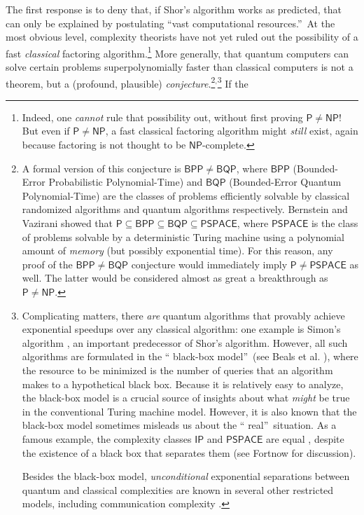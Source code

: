 \documentclass[12pt,onecolumn]{article}%
\begin{document}
The first response is to deny that, if Shor's algorithm works as predicted,
that can only be explained by postulating \textquotedblleft vast computational
resources.\textquotedblright\  At the most obvious level, complexity
theorists have not yet ruled out the possibility of a fast \textit{classical}
factoring algorithm.\footnote{Indeed, one \textit{cannot} rule that
possibility out, without first proving $\mathsf{P}\neq\mathsf{NP}$! But even
if $\mathsf{P}\neq\mathsf{NP}$, a fast classical factoring algorithm might
\textit{still} exist, again because factoring is not thought to be
$\mathsf{NP}$-complete.} More generally, that quantum computers can solve
certain problems superpolynomially faster than classical computers is not a
theorem, but a (profound, plausible) \textit{conjecture}.\footnote{A formal
version of this conjecture is $\mathsf{BPP}\neq\mathsf{BQP}$, where
$\mathsf{BPP}$ (Bounded-Error Probabilistic Polynomial-Time) and
$\mathsf{BQP}$ (Bounded-Error Quantum Polynomial-Time) are the classes of
problems efficiently solvable by classical randomized algorithms and quantum
algorithms respectively. Bernstein and Vazirani \cite{bv} showed that
$\mathsf{P}\subseteq\mathsf{BPP}\subseteq\mathsf{BQP}\subseteq\mathsf{PSPACE}%
$, where $\mathsf{PSPACE}$ is the class of problems solvable by a
deterministic Turing machine using a polynomial amount of \textit{memory} (but
possibly exponential time). For this reason, any proof of the $\mathsf{BPP}%
\neq\mathsf{BQP}$ conjecture would immediately imply $\mathsf{P}%
\neq\mathsf{PSPACE}$ as well. The latter would be considered almost as great
a breakthrough as $\mathsf{P}\neq\mathsf{NP}$.}$^{,}$\footnote{Complicating
matters, there \textit{are} quantum algorithms that provably achieve
exponential speedups over any classical algorithm: one example is Simon's
algorithm \cite{simon}, an important predecessor of Shor's algorithm.
 However, all such algorithms are formulated in the \textquotedblleft
black-box model\textquotedblright\  (see Beals et al. \cite{bbcmw}), where
the resource to be minimized is the number of queries that an algorithm makes
to a hypothetical black box. Because it is relatively easy to analyze, the
black-box model is a crucial source of insights about what \textit{might} be
true in the conventional Turing machine model. However, it is also known
that the black-box model sometimes misleads us about the \textquotedblleft
real\textquotedblright\  situation. As a famous example, the complexity
classes $\mathsf{IP}$ and $\mathsf{PSPACE}$ are equal \cite{shamir}, despite
the existence of a black box that separates them (see Fortnow
\cite{fortnow:rel} for discussion).
\par
Besides the black-box model, \textit{unconditional} exponential separations
between quantum and classical complexities are known in several other
restricted models, including communication complexity \cite{raz:cc}.} If the
\end{document}
